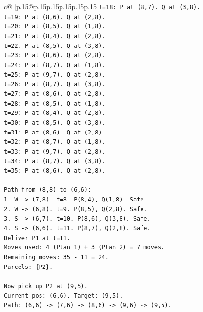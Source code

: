 \documentclass{article}
\begin{document}
{\begin{supertabular}{c@{$\;$}|p{.15\linewidth}@{}p{.15\linewidth}p{.15\linewidth}p{.15\linewidth}p{.15\linewidth}p{.15\linewidth}}
{{{\texttt{t=18: P at (8,7). Q at (3,8).} \\
\texttt{t=19: P at (8,6). Q at (2,8).} \\
\texttt{t=20: P at (8,5). Q at (1,8).} \\
\texttt{t=21: P at (8,4). Q at (2,8).} \\
\texttt{t=22: P at (8,5). Q at (3,8).} \\
\texttt{t=23: P at (8,6). Q at (2,8).} \\
\texttt{t=24: P at (8,7). Q at (1,8).} \\
\texttt{t=25: P at (9,7). Q at (2,8).} \\
\texttt{t=26: P at (8,7). Q at (3,8).} \\
\texttt{t=27: P at (8,6). Q at (2,8).} \\
\texttt{t=28: P at (8,5). Q at (1,8).} \\
\texttt{t=29: P at (8,4). Q at (2,8).} \\
\texttt{t=30: P at (8,5). Q at (3,8).} \\
\texttt{t=31: P at (8,6). Q at (2,8).} \\
\texttt{t=32: P at (8,7). Q at (1,8).} \\
\texttt{t=33: P at (9,7). Q at (2,8).} \\
\texttt{t=34: P at (8,7). Q at (3,8).} \\
\texttt{t=35: P at (8,6). Q at (2,8).} \\
\\ 
\texttt{Path from (8,8) to (6,6):} \\
\texttt{1. W {-}> (7,8). t=8. P(8,4), Q(1,8). Safe.} \\
\texttt{2. W {-}> (6,8). t=9. P(8,5), Q(2,8). Safe.} \\
\texttt{3. S {-}> (6,7). t=10. P(8,6), Q(3,8). Safe.} \\
\texttt{4. S {-}> (6,6). t=11. P(8,7), Q(2,8). Safe.} \\
\texttt{Deliver P1 at t=11.} \\
\texttt{Moves used: 4 (Plan 1) + 3 (Plan 2) = 7 moves.} \\
\texttt{Remaining moves: 35 {-} 11 = 24.} \\
\texttt{Parcels: \{P2\}.} \\
\\ 
\texttt{Now pick up P2 at (9,5).} \\
\texttt{Current pos: (6,6). Target: (9,5).} \\
\texttt{Path: (6,6) {-}> (7,6) {-}> (8,6) {-}> (9,6) {-}> (9,5).} \\
}}}
\end{supertabular}}
\end{document}
